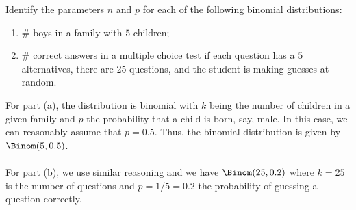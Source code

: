 \begin{problem}[Handout 8, \# 2]
  Identify the parameters \(n\) and \(p\) for each of the following
  binomial distributions:
  \begin{enumerate}[label=(\alph*),noitemsep]
  \item \(\#\) boys in a family with \(5\) children;
  \item \(\#\) correct answers in a multiple choice test if each
    question has a \(5\) alternatives, there are \(25\) questions, and the
    student is making guesses at random.
  \end{enumerate}
\end{problem}
\begin{solution}
  For part (a), the distribution is binomial with \(k\) being the number of
  children in a given family and \(p\) the probability that a child is
  born, say, male. In this case, we can reasonably assume that
  \(p=0.5\). Thus, the binomial distribution is given by
  \(\Binom(5,0.5)\).
  \\\\
  For part (b), we use similar reasoning and we have \(\Binom(25,0.2)\)
  where \(k=25\) is the number of questions and \(p=1/5=0.2\) the
  probability of guessing a question correctly.
\end{solution}
\newpage

